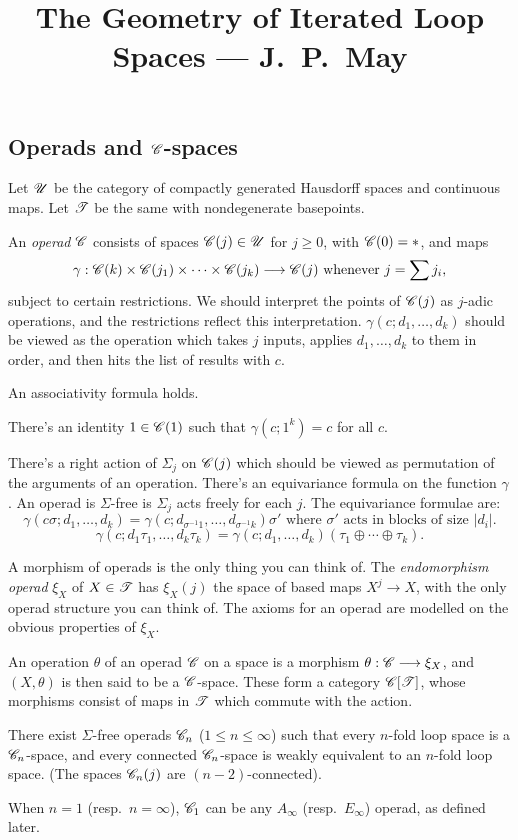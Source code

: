 \documentclass[11pt]{article}
\title{The Geometry of Iterated Loop Spaces\small{ --- J.\ P.\ May}}
\begin{document}
\tableofcontents
\begin{chapter1-3}
\section{Operads and \texorpdfstring{$\mathscr{C}$}{C}-spaces}
Let $\mathscr{U}$ be the category of compactly generated Hausdorff spaces and continuous
 maps. 
Let $\mathscr{T}$ be the same with nondegenerate basepoints.

An \emph{operad} $\mathscr{C}$ consists of spaces $\mathscr{C}(j)\in\mathscr{U}$ for $j\geq0$,
 with $\mathscr{C}(0)=*$, and maps
\[\gamma:\mathscr{C}(k)\times\mathscr{C}(j_1)\times\cdots\times\mathscr{C}(j_k)\longrightarrow\mathscr{C}(j)
\text{ whenever }j=\sum j_i,\]
subject to certain restrictions. We should interpret the points of $\mathscr{C}(j)$ as
$j$-adic operations, and the restrictions reflect this interpretation.
$\gamma(c;d_1,\ldots,d_k)$ should be viewed as the operation which takes $j$
inputs, applies $d_1,\ldots,d_k$ to them in order, and then hits the list of
results with $c$.
\begin{itemise}
\item An associativity formula holds.
\item There's an identity $1\in\mathscr{C}(1)$ such that $\gamma(c;1^k)=c$ for all $c$.
\item There's a right action of $\Sigma_j$ on $\mathscr{C}(j)$ which should be viewed as
permutation of the arguments of an operation. There's an equivariance formula on
the function $\gamma$. An operad is $\Sigma$-free is $\Sigma_j$ acts freely for
each $j$. The equivariance formulae are:
\[\gamma(c\sigma;d_1,\ldots,d_k)=\gamma(c;d_{\sigma^{-1}1},\ldots,
d_{\sigma^{-1}k})\sigma'\text{ where }\sigma'\text{ acts in 
blocks of size $|d_i|$}.\]
\[\gamma(c;d_1\tau_1,\ldots,d_k\tau_k)=\gamma(c;d_1,\ldots,d_k)(\tau_1\oplus
\cdots\oplus\tau_k).\]
\end{itemise}
A morphism of operads is the only thing you can think of. The \emph{endomorphism
operad} $\xi_X$ of $X\in\mathscr{T}$ has $\xi_X(j)$ the space of based maps $X^j\to
X$, with the only operad structure you can think of. The axioms for an operad are
modelled on the obvious properties of $\xi_X$.

An operation $\theta$ of an operad $\mathscr{C}$ on a space is a morphism
$\theta:\mathscr{C}\longrightarrow\xi_X$, and $(X,\theta)$ is then said to be a $\mathscr{C}$-space. These
form a category $\mathscr{C}[\mathscr{T}]$, whose morphisms consist of maps in $\mathscr{T}$ which
commute with the action.
\begin{thm*}[1.3]
There exist $\Sigma$-free operads $\mathscr{C}_n$ ($1\leq n\leq\infty$) such that every
$n$-fold loop space is a $\mathscr{C}_n$-space, and every connected $\mathscr{C}_n$-space
is weakly equivalent to an $n$-fold loop space. (The spaces $\mathscr{C}_n(j)$ are 
$(n-2)$-connected).
\end{thm*}
When $n=1$  (resp.\ $n=\infty$), $\mathscr{C}_1$ can be any $A_\infty$ 
(resp.\ $E_\infty$) operad, as defined later.


\end{chapter1-3}
\end{document}
